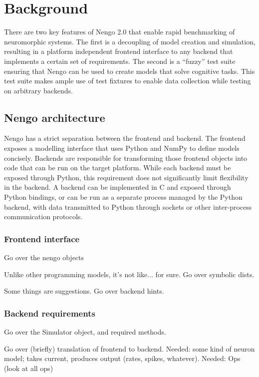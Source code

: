 \documentclass{frontiersSCNS}
\begin{document}
\section{Background}

There are two key features of Nengo 2.0
that enable rapid benchmarking of neuromorphic systems.
The first is a decoupling of model creation and simulation,
resulting in a platform independent frontend interface
to any backend that implements a certain set of requirements.
The second is a ``fuzzy'' test suite ensuring that
Nengo can be used to create models that solve cognitive tasks.
This test suite makes ample use of test fixtures
to enable data collection while testing on arbitrary backends.

\subsection{Nengo architecture}

Nengo has a strict separation between
the frontend and backend.
The frontend exposes a modelling interface
that uses Python and NumPy \cite{???}
to define models concisely.
Backends are responsible for transforming
those frontend objects into code that
can be run on the target platform.
While each backend must be exposed
through Python, this requirement
does not significantly limit
flexibility in the backend.
A backend can be implemented in C and exposed
through Python bindings,
or can be run as a separate process
managed by the Python backend,
with data transmitted to Python through sockets
or other inter-process communication protocols.

\subsubsection{Frontend interface}

Go over the nengo objects

Unlike other programming models,
it's not like... for sure.
Go over symbolic dists.

Some things are suggestions.
Go over backend hints.

\subsubsection{Backend requirements}

Go over the Simulator object, and required methods.

Go over (briefly) translation of frontend to backend.
Needed: some kind of neuron model; takes current,
produces output (rates, spikes, whatever).
Needed: Ops (look at all ops)
\end{document}
